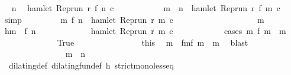\begin{isabellebody}
\ \isamarkupfalse%
\ n\ \isamarkupfalse%
\ {\isacartoucheopen}hamlet\ {\isacharparenleft}Rep{\isacharunderscore}run\ r\ {\isacharparenleft}f\ n{\isacharparenright}\ c\isanewline
\ \ \ \ \ \ \isamarkupfalse%
\ {}\ \isamarkupfalse%
\ {}{\isacharcolon}{\isacartoucheopen}{\isasymforall}\ m\ {\isasymge}\ n{\isachardot}\ {\isasymnot}\ hamlet\ {\isacharparenleft}Rep{\isacharunderscore}run\ r\ {\isacharparenleft}f\ m{\isacharparenright}\ c\ \isamarkupfalse%
\ simp\isanewline
\ \ \ \ \ \ \isamarkupfalse%
\ {\isacartoucheopen}{\isasymforall}\ m{\isasymge}\ {\isacharparenleft}f\ n{\isacharparenright}{\isachardot}\ {\isasymnot}\ hamlet\ {\isacharparenleft}Rep{\isacharunderscore}run\ r\ m\ c\isanewline
\ \ \ \ \ \ \isamarkupfalse%
\ {\isacharminus}\isanewline
\ \ \ \ \ \ \ \ \isacommand{{\isacharbraceleft}}\isamarkupfalse%
\ \isamarkupfalse%
\ m\ \isamarkupfalse%
\ h{\isacharcolon}{\isacartoucheopen}m\ {\isasymge}\ f\ n{\isacartoucheclose}\isanewline
\ \ \ \ \ \ \ \ \ \ \isamarkupfalse%
\ {\isacartoucheopen}{\isasymnot}\ hamlet\ {\isacharparenleft}Rep{\isacharunderscore}run\ r\ m\ c\isanewline
\ \ \ \ \ \ \ \ \ \ \isamarkupfalse%
\ {\isacharparenleft}cases\ {\isacartoucheopen}{\isasymexists}m\ f\ m\ {\isacharequal}\ m{\isacartoucheclose}{\isacharparenright}\isanewline
\ \ \ \ \ \ \ \ \ \ \ \ \isamarkupfalse%
\ True\isanewline
\ \ \ \ \ \ \ \ \ \ \ \ \ \ \isamarkupfalse%
\ this\ \isamarkupfalse%
\ m\ \ fm{}{\isacharcolon}{\isacartoucheopen}f\ m\ {\isacharequal}\ m{\isacartoucheclose}\ \isamarkupfalse%
\ blast\isanewline
\ \ \ \ \ \ \ \ \ \ \ \ \ \ \isamarkupfalse%
\ {\isacartoucheopen}m\ {\isasymge}\ n{\isacartoucheclose}\isanewline
\ \ \ \ \ \ \ \ \ \ \ \ \ \ \ \ \isamarkupfalse%
\ {\isacharasterisk}\ dilating{\isacharunderscore}def\ dilating{\isacharunderscore}fun{\isacharunderscore}def\ h\ strict{\isacharunderscore}mono{\isacharunderscore}less{\isacharunderscore}eq\ \isamarkupfalse%

\end{isabellebody}
